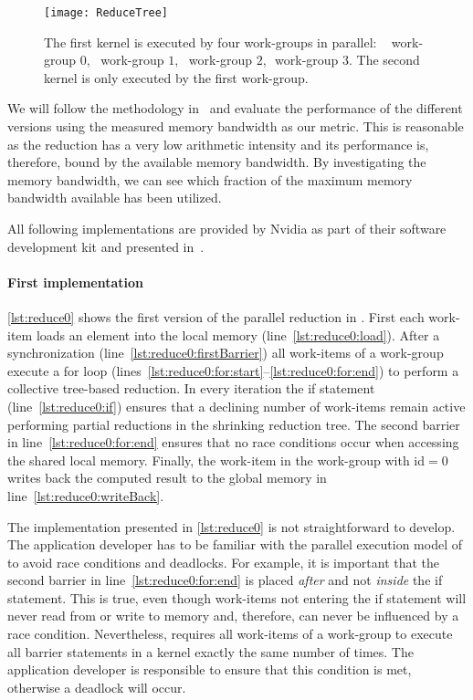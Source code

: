 \begin{figure}[t]
  \centering
  \texttt{[image: ReduceTree]}
  \caption{The first \OpenCL kernel is executed by four work-groups in parallel:
    \ \protect\firstBox{}\,\,work-group $0$,\ \protect\secondBox{}\,\,work-group $1$,\ \protect\thirdBox{}\,\,work-group $2$, \protect\fourthBox{}\,\,work-group $3$.
           The second \OpenCL kernel is only executed by the first work-group.}
  \label{fig:reduce:tree}
\end{figure}

We will follow the methodology in~\cite{Harris2007} and evaluate the performance of the different versions using the measured memory bandwidth as our metric.
This is reasonable as the reduction has a very low arithmetic intensity and its performance is, therefore, bound by the available memory bandwidth.
By investigating the memory bandwidth, we can see which fraction of the maximum memory bandwidth available has been utilized.

All following implementations are provided by Nvidia as part of their software development kit and presented in~\cite{Harris2007}.

\paragraph{First \OpenCL implementation}
\autoref{lst:reduce0} shows the first version of the parallel reduction in \OpenCL.
First each work-item loads an element into the local memory (line~\ref{lst:reduce0:load}).
After a synchronization (line~\ref{lst:reduce0:firstBarrier}) all work-items of a work-group execute a for loop (lines~\ref{lst:reduce0:for:start}--\ref{lst:reduce0:for:end}) to perform a collective tree-based reduction.
In every iteration the if statement (line~\ref{lst:reduce0:if}) ensures that a declining number of work-items remain active performing partial reductions in the shrinking reduction tree.
The second barrier in line~\ref{lst:reduce0:for:end} ensures that no race conditions occur when accessing the shared local memory.
Finally, the work-item in the work-group with id$=0$ writes back the computed result to the global memory in line~\ref{lst:reduce0:writeBack}.

The implementation presented in \autoref{lst:reduce0} is not straightforward to develop.
The application developer has to be familiar with the parallel execution model of \OpenCL to avoid race conditions and deadlocks.
For example, it is important that the second barrier in line~\ref{lst:reduce0:for:end} is placed \emph{after} and not \emph{inside} the if statement.
This is true, even though work-items not entering the if statement will never read from or write to memory and, therefore, can never be influenced by a race condition.
Nevertheless, \OpenCL requires all work-items of a work-group to execute all barrier statements in a kernel exactly the same number of times.
The application developer is responsible to ensure that this condition is met, otherwise a deadlock will occur.

